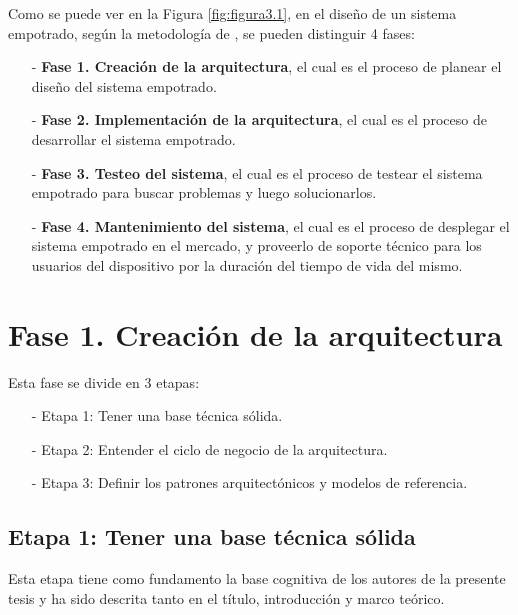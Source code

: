 Como se puede ver en la Figura \ref{fig:figura3.1}, en el diseño de un sistema empotrado, según la metodología de \cite{tammy}, se pueden distinguir 4 fases: 
\begin{enumerate}
\item[-]\textbf{Fase 1. Creación de la arquitectura}, el cual es el proceso de planear el diseño del sistema empotrado.
\item[-]\textbf{Fase 2. Implementación de la arquitectura}, el cual es el proceso de desarrollar el sistema empotrado. 
\item[-]\textbf{Fase 3. Testeo del sistema}, el cual es el proceso de testear el sistema empotrado para buscar problemas y luego solucionarlos. 
\item[-]\textbf{Fase 4. Mantenimiento del sistema}, el cual es el proceso de desplegar el sistema empotrado en el mercado, y proveerlo de soporte técnico para los usuarios del dispositivo por la duración del tiempo de vida del mismo.
\end{enumerate}

\section{Fase 1. Creación de la arquitectura}
Esta fase se divide en 3 etapas:
\begin{enumerate}
\item[-]Etapa 1: Tener una base técnica sólida.
\item[-]Etapa 2: Entender el ciclo de negocio de la arquitectura.
\item[-]Etapa 3: Definir los patrones arquitectónicos y modelos de referencia.
\end{enumerate}

\subsection{Etapa 1: Tener una base técnica sólida}
Esta etapa tiene como fundamento la base cognitiva de los autores de la presente tesis y ha sido descrita tanto en el título, introducción y marco teórico.

